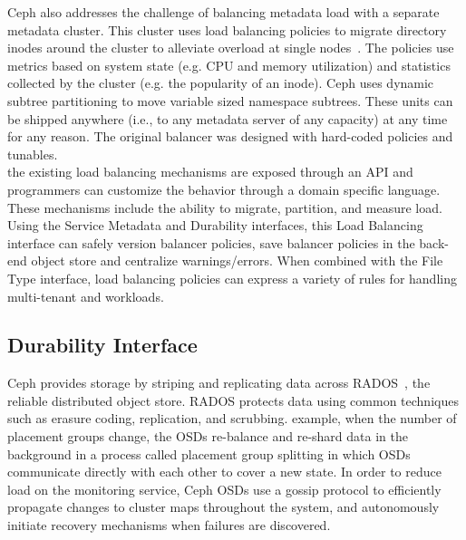  Ceph
also addresses the challenge of balancing  metadata
load with a separate metadata cluster. This cluster uses load balancing
policies to migrate directory inodes around the cluster to alleviate overload
at single nodes~\cite{weil:sc2004-dyn-metadata}.  The policies use metrics
based on system state (e.g.  CPU and memory utilization) and statistics
collected by the cluster (e.g. the popularity of an inode). Ceph uses dynamic
subtree partitioning to move variable sized namespace subtrees. These units can
be shipped anywhere (i.e., to any metadata server of any capacity) at any time
for any reason. The original balancer was designed with hard-coded policies and
tunables.\\

 the existing load balancing mechanisms
are exposed through an API and programmers can customize the behavior through a
domain specific language. These mechanisms include the ability to migrate,
partition, and measure load. Using the Service Metadata and Durability
interfaces, this Load Balancing interface can safely version balancer policies,
save balancer policies in the back-end object store and centralize
warnings/errors. When combined with the File Type interface, load balancing
policies can express a variety of rules for handling multi-tenant and
workloads.

 

\subsection{Durability Interface}
\label{sec:durability}


 Ceph provides storage
by striping and replicating data across RADOS~\cite{weil_rados_2007}, the
reliable distributed object store. RADOS protects data using common techniques
such as erasure coding, replication, and scrubbing.  example, when the number
of placement groups change, the OSDs re-balance and re-shard data in the
background in a process called placement group splitting in which OSDs
communicate directly with each other to cover a new state.  In order to reduce
load on the monitoring service, Ceph OSDs use a gossip protocol to efficiently
propagate changes to cluster maps throughout the system, and autonomously
initiate recovery mechanisms when failures are discovered.\\

